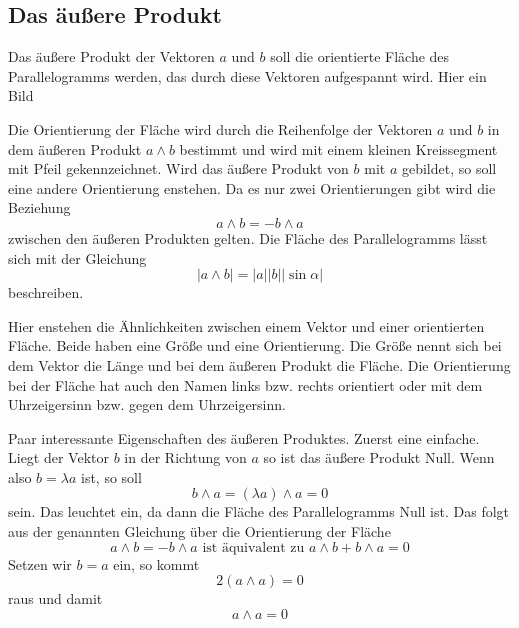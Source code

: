 \documentclass[fleqn]{scrartcl}
\numberwithin{equation}{section}
\begin{document}
\subsection{Das äußere Produkt}
Das äußere Produkt der Vektoren $a$ und $b$ soll die orientierte Fläche des
Parallelogramms werden, das durch diese Vektoren aufgespannt wird. Hier ein
Bild
\begin{center}
\begin{minipage}{\linewidth}
\centering
{}
\label{fig:outherProduct}
\end{minipage}
\end{center}

Die Orientierung der Fläche wird durch die Reihenfolge der Vektoren $a$ und
$b$ in dem äußeren Produkt $a\wedge b$ bestimmt und wird mit einem kleinen
Kreissegment mit Pfeil gekennzeichnet. Wird das äußere Produkt von $b$ mit $a$
gebildet, so soll eine andere Orientierung enstehen. Da es nur zwei
Orientierungen gibt wird die Beziehung
\[a\wedge b = - b\wedge a\]
zwischen den äußeren Produkten gelten. Die Fläche des Parallelogramms lässt
sich mit der Gleichung
\[|a\wedge b| = |a||b||\sin\alpha|\]
beschreiben.

Hier enstehen die Ähnlichkeiten zwischen einem Vektor und einer orientierten
Fläche. Beide haben eine Größe und eine Orientierung. Die Größe nennt sich bei
dem Vektor die Länge und bei dem äußeren Produkt die Fläche. Die Orientierung
bei der Fläche hat auch den Namen links bzw. rechts orientiert oder mit dem
Uhrzeigersinn bzw. gegen dem Uhrzeigersinn.

Paar interessante Eigenschaften des äußeren Produktes. Zuerst eine einfache.
Liegt der Vektor $b$ in der Richtung von $a$ so ist das äußere Produkt Null.
Wenn also $b=\lambda a$ ist, so soll
\[b\wedge a = (\lambda a)\wedge a= 0\]
sein. Das leuchtet ein, da dann die Fläche des Parallelogramms Null ist. Das
folgt aus der genannten Gleichung über die Orientierung der Fläche
\[a\wedge b = - b\wedge a \textrm{ ist äquivalent zu } a\wedge b + b\wedge a = 0\]
Setzen wir $b = a$ ein, so kommt
\[2(a\wedge a)=0\]
raus und damit
\[a\wedge a = 0\]
\end{document}
